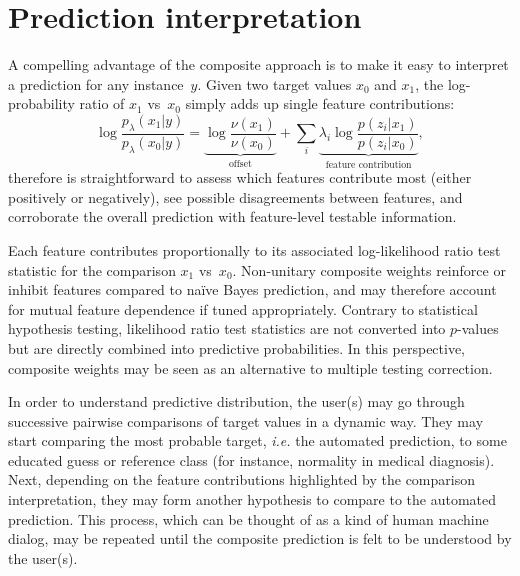 \documentclass[english]{scrartcl}
\begin{document}
\section{Prediction interpretation}

A compelling advantage of the composite approach is to make it easy to interpret a prediction for any instance~$y$. Given two target values $x_0$ and $x_1$, the log-probability ratio of $x_1$ vs~$x_0$ simply adds up single feature contributions: 
$$
\log \frac{p_\lambda(x_1|y)}{p_\lambda(x_0|y)}
= 
\underbrace{\log \frac{\nu(x_1)}{\nu(x_0)}}_{\text{offset}}
+ \sum_i \underbrace{\lambda_i \log \frac{p(z_i|x_1)}{p(z_i|x_0)}}_{\text{feature contribution}},
$$
therefore is straightforward to assess which features contribute most (either positively or negatively), see possible disagreements between features, and corroborate the overall prediction with feature-level testable information. 

Each feature contributes proportionally to its associated log-likelihood ratio test statistic for the comparison $x_1$ vs~$x_0$. Non-unitary composite weights reinforce or inhibit features compared to na\"ive Bayes prediction, and may therefore account for mutual feature dependence if tuned appropriately. Contrary to statistical hypothesis testing, likelihood ratio test statistics are not converted into $p$-values but are directly combined into predictive probabilities. In this perspective, composite weights may be seen as an alternative to multiple testing correction.





In order to understand predictive distribution, the user(s) may go through successive pairwise comparisons of target values in a dynamic way. They may start comparing the most probable target, {\em i.e.} the automated prediction, to some educated guess or reference class (for instance, normality in medical diagnosis). Next, depending on the feature contributions highlighted by the comparison interpretation, they may form another hypothesis to compare to the automated prediction. This process, which can be thought of as a kind of human machine dialog, may be repeated until the composite prediction is felt to be understood by the user(s).
\end{document}
